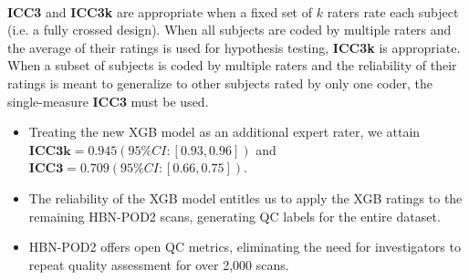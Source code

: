 \documentclass[a0paper,landscape,fontscale=0.395]{baposter}
\newenvironment{Figure}
  {\par\medskip\noindent\minipage{\linewidth}}
  {\endminipage\par\medskip}
\begin{document}
\begin{poster}
{\begin{multicols}{2}
\begin{Figure}
    \end{Figure}

    \vspace{2em}
    {\smaller %
        \textsuperscript{\textasteriskcentered} \textbf{ICC3} and \textbf{ICC3k}
        are appropriate when a fixed set of $k$ raters rate each subject (i.e. a
        fully crossed design).  When all subjects are coded by multiple raters
        and the average of their ratings is used for hypothesis testing,
        \textbf{ICC3k} is appropriate.  When a subset of subjects is coded by
        multiple raters and the reliability of their ratings is meant to
        generalize to other subjects rated by only one coder, the single-measure
        \textbf{ICC3} must be used.
    }
\end{multicols}

\begin{itemize}[noitemsep, leftmargin=*]
    \item Treating the new XGB model as an additional expert rater, we attain
    $\textbf{ICC3k} = 0.945 (95\% CI: [0.93, 0.96])$ and 
    $\textbf{ICC3} = 0.709 (95\% CI: [0.66, 0.75])$.
    \item The reliability of the XGB model entitles us to apply the XGB ratings
    to the remaining HBN-POD2 scans, generating QC labels for the entire
    dataset.
    \item HBN-POD2 offers open QC metrics, eliminating the need for
    investigators to repeat quality assessment for over 2,000 scans.
\end{itemize}
}



\end{poster}
\end{document}
